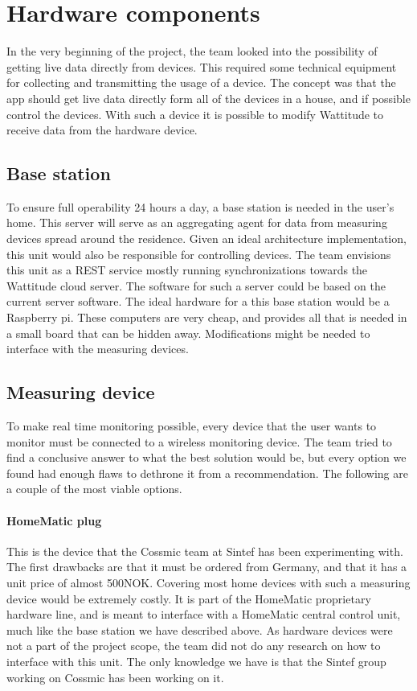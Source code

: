 \section{Hardware components}
In the very beginning of the project, the team looked into the possibility of getting live data directly from devices. This required some technical equipment for collecting and transmitting the usage of a device. The concept was that the app should get live data directly form all of the devices in a house, and if possible control the devices. With such a device it is possible to modify Wattitude to receive data from the hardware device.

\subsection{Base station}
To ensure full operability 24 hours a day, a base station is needed in the user's home. This server will serve as an aggregating agent for data from measuring devices spread around the residence. Given an ideal architecture implementation, this unit would also be responsible for controlling devices. The team envisions this unit as a REST service mostly running synchronizations towards the Wattitude cloud server. The software for such a server could be based on the current server software. The ideal hardware for a this base station would be a Raspberry pi. These computers are very cheap, and provides all that is needed in a small board that can be hidden away. Modifications might be needed to interface with the measuring devices. 

\subsection{Measuring device}
To make real time monitoring possible, every device that the user wants to monitor must be connected to a wireless monitoring device. The team tried to find a conclusive answer to what the best solution would be, but every option we found had enough flaws to dethrone it from a recommendation. The following are a couple of the most viable options.

\paragraph{HomeMatic plug}
This is the device that the Cossmic team at Sintef has been experimenting with. The first drawbacks are that it must be ordered from Germany, and that it has a unit price of almost 500NOK. Covering most home devices with such a measuring device would be extremely costly. It is part of the HomeMatic proprietary hardware line, and is meant to interface with a HomeMatic central control unit, much like the base station we have described above. As hardware devices were not a part of the project scope, the team did not do any research on how to interface with this unit. The only knowledge we have is that the Sintef group working on Cossmic has been working on it.

